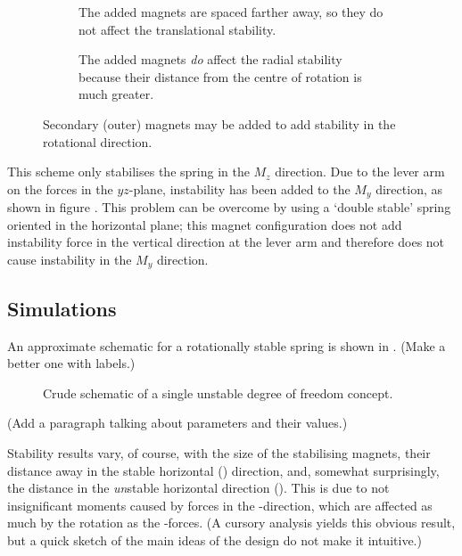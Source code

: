 \begin{figure}
  \begin{subfigure}
    \caption{
     The added magnets are spaced farther away, 
     so they do not affect the
     translational stability.
     }
  \end{subfigure}
  \begin{subfigure}
    \caption{
      The added magnets \emph{do} affect the radial stability
      because their distance from the centre of rotation is much greater.
      }
  \end{subfigure}
  \caption{Secondary (outer) magnets may be added to add stability
      in the rotational direction.}
\end{figure}

This scheme only stabilises the spring in the $M_z$ direction. Due to
the lever arm on the forces in the $yz$-plane, instability has been
added to the $M_y$ direction, as shown in figure \fixme{}. This problem
can be overcome by using a `double stable' spring 
oriented in the horizontal plane; this magnet configuration does not
add instability force in the vertical direction at the lever arm and
therefore does not cause instability in the $M_y$ direction. 


\subsection{Simulations}

An approximate schematic for a rotationally stable spring is shown in
. (Make a better one with labels.)

\begin{figure}
  \caption{Crude schematic of a single unstable degree of freedom concept.}
\end{figure}

(Add a paragraph talking about parameters and their values.)

Stability results vary, of course, with the size of the stabilising
magnets, their distance away in the stable horizontal (\y) direction,
and, somewhat surprisingly, the distance in the \emph{un}stable
horizontal direction (\z). This is due to not insignificant moments
caused by forces in the \y-direction, which are affected as much by
the rotation as the \z-forces. (A cursory analysis yields this obvious
result, but a quick sketch of the main ideas of the design do not make
it intuitive.)

